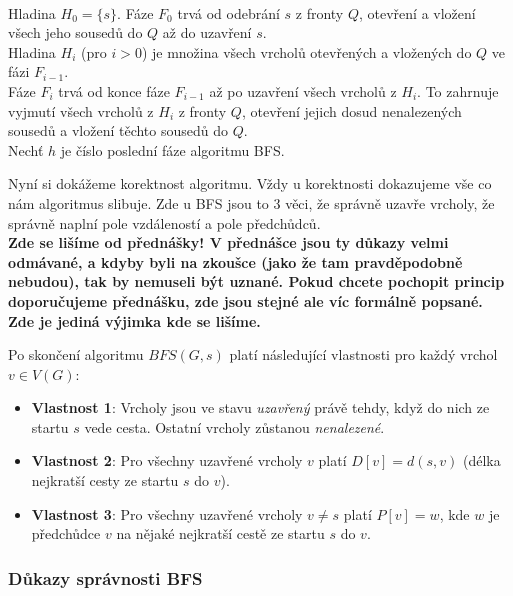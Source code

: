 \begin{definition}
    \leavevmode\\
    Hladina $H_0 = \{s\}$. Fáze $F_0$ trvá od odebrání $s$ z fronty $Q$, otevření a vložení všech jeho sousedů do $Q$ až do uzavření $s$. \\
    Hladina $H_i$ (pro $i > 0$) je množina všech vrcholů otevřených a vložených do $Q$ ve fázi $F_{i-1}$. \\
    Fáze $F_i$ trvá od konce fáze $F_{i-1}$ až po uzavření všech vrcholů z $H_i$. To zahrnuje vyjmutí všech vrcholů z $H_i$ z fronty $Q$, otevření jejich dosud nenalezených sousedů a vložení těchto sousedů do $Q$. \\
    Nechť $h$ je číslo poslední fáze algoritmu BFS.
\end{definition} \bigskip



\noindent Nyní si dokážeme korektnost algoritmu. Vždy u korektnosti dokazujeme vše co nám algoritmus slibuje. Zde u BFS jsou to 3 věci, že správně uzavře vrcholy, že správně naplní pole vzdáleností a pole předchůdců. \\

\noindent \textbf{Zde se lišíme od přednášky! V přednášce jsou ty důkazy velmi odmávané, a kdyby byli na zkoušce (jako že tam pravděpodobně nebudou), tak by nemuseli být uznané. Pokud chcete pochopit princip doporučujeme přednášku, zde jsou stejné ale víc formálně popsané. Zde je jediná výjimka kde se lišíme.}


\begin{theorem}
Po skončení algoritmu $BFS(G, s)$ platí následující vlastnosti pro každý vrchol $v \in V(G)$:
\begin{itemize}
    \item \textbf{Vlastnost 1}: Vrcholy jsou ve stavu \textit{uzavřený} právě tehdy, když do nich ze startu $s$ vede cesta. Ostatní vrcholy zůstanou \textit{nenalezené}.
    \item \textbf{Vlastnost 2}: Pro všechny uzavřené vrcholy $v$ platí $D[v] = d(s, v)$ (délka nejkratší cesty ze startu $s$ do $v$).
    \item \textbf{Vlastnost 3}: Pro všechny uzavřené vrcholy $v \neq s$ platí $P[v] = w$, kde $w$ je předchůdce $v$ na nějaké nejkratší cestě ze startu $s$ do $v$.
\end{itemize}
\end{theorem} \bigskip

\subsubsection{Důkazy správnosti BFS}

